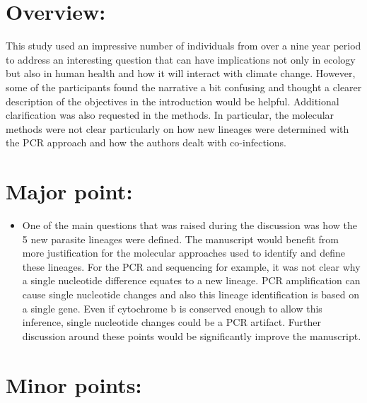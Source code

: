 \documentclass[10pt]{article}
\providecommand{\tightlist}{\setlength{\itemsep}{0pt}\setlength{\parskip}{0pt}}%
\begin{document}
\par\null

\section*{Overview:}

{\label{488681}}

This study used an impressive number of individuals from over a nine
year period to address an interesting question that can have
implications not only in ecology but also in human health and how it
will interact with climate change. However, some of the participants
found the narrative a bit confusing and thought a clearer description of
the objectives in the introduction would be helpful. Additional
clarification was also requested in the methods. In particular, the
molecular methods were not clear particularly on how new lineages were
determined with the PCR approach and how the authors dealt with
co-infections.~

\par\null

\section*{Major point:}

{\label{657196}}\par\null

\begin{itemize}
\tightlist
\item
  One of the main questions that was raised during the discussion was
  how the 5 new parasite lineages were defined. The manuscript would
  benefit from more justification for the molecular approaches used to
  identify and define these lineages. For the PCR and sequencing for
  example, it was not clear why a single nucleotide difference equates
  to a new lineage. PCR amplification can cause single nucleotide
  changes and also this lineage identification is based on a single
  gene. Even if cytochrome b is conserved enough to allow this
  inference, single nucleotide changes could be a PCR artifact. Further
  discussion around these points would be significantly improve the
  manuscript.
\end{itemize}

\par\null

\section*{Minor points:}
\end{document}
